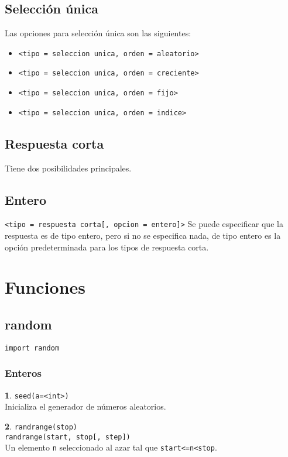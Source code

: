 \documentclass[12pt]{article}
\theoremstyle{definition}
\newtheorem{funcion}{}[section]
\begin{document}
\subsection{Selecci\'on \'unica}
Las opciones para selecci\'on \'unica son las siguientes:
\begin{itemize}
  \item \verb|<tipo = seleccion unica, orden = aleatorio>|
  \item \verb|<tipo = seleccion unica, orden = creciente>|
  \item \verb|<tipo = seleccion unica, orden = fijo>|
  \item \verb|<tipo = seleccion unica, orden = indice>|
\end{itemize}

\subsection{Respuesta corta}

Tiene dos posibilidades principales.

\subsection{Entero}

\noindent \verb|<tipo = respuesta corta[, opcion = entero]>|
Se puede especificar que la respuesta es de tipo entero, pero si no se especifica nada, de tipo entero es la opción predeterminada para los tipos de respuesta corta.


\section{Funciones}

\subsection{random}
\noindent \verb|import random|

\subsubsection{Enteros}

\begin{funcion}
  \verb|seed(a=<int>)| \\[1ex]
  Inicializa el generador de números aleatorios.
\end{funcion}

\begin{funcion}
  \verb|randrange(stop)| \\
  \verb|randrange(start, stop[, step])| \\[1ex]
  Un elemento \verb|n| seleccionado al azar tal que \verb|start<=n<stop|.
\end{funcion}
\end{document}
